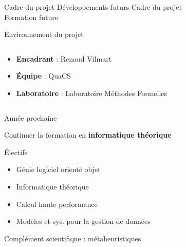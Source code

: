 \begin{frame}{Cadre du projet Développements futurs}
  \huge{Cadre du projet \\ Formation future}
\end{frame}

\begin{frame}{Environnement du projet}
  \begin{columns}
      \begin{column}{0.6\textwidth}
          \begin{itemize}
              \item \textbf{Encadrant} : Renaud Vilmart
              \item \textbf{Équipe} : QuaCS
              \item \textbf{Laboratoire} : Laboratoire Méthodes Formelles
          \end{itemize}
      \end{column}
      \begin{column}{0.4\textwidth}
          \begin{center}
              
              \vspace{0.5cm}
              
          \end{center}
      \end{column}
  \end{columns}
\end{frame}

\begin{frame}{Année prochaine}
\begin{center}
  Continuer la formation en \textbf{informatique théorique}
\end{center}
\small{Électifs} %
\footnotesize{
\begin{itemize}
  \item Génie logiciel orienté objet
  \item Informatique théorique
  \item Calcul haute performance
  \item Modèles et sys. pour la gestion de données
\end{itemize}}
\vspace{1em}
\small{Complément scientifique : métaheuristiques}
\end{frame}

